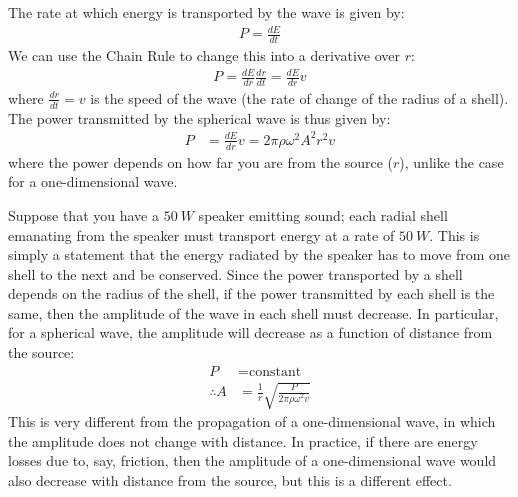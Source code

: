 The rate at which energy is transported by the wave is given by:
\begin{align*}
P = \frac{dE}{dt}
\end{align*}
We can use the Chain Rule to change this into a derivative over $r$:
\begin{align*}
P = \frac{dE}{dr}\frac{dr}{dt}=\frac{dE}{dr}v
\end{align*}
where $\frac{dr}{dt}=v$ is the speed of the wave (the rate of change of the radius of a shell). The power transmitted by the spherical wave is thus given by:
\begin{align*}
P &=\frac{dE}{dr}v =2\pi\rho  \omega^2 A^2  r^2 v
\end{align*}
where the power depends on how far you are from the source ($r$), unlike the case for a one-dimensional wave. 

Suppose that you have a $\SI{50}{W}$ speaker emitting sound; each radial shell emanating from the speaker must transport energy at a rate of $\SI{50}{W}$. This is simply a statement that the energy radiated by the speaker has to move from one shell to the next and be conserved. Since the power transported by a shell depends on the radius of the shell, if the power transmitted by each shell is the same, then the amplitude of the wave in each shell must decrease. In particular, for a spherical wave, the amplitude will decrease as a function of distance from the source:
\begin{align*}
P& = \text{constant}\\
\therefore A&=\frac{1}{r}\sqrt{\frac{P}{2\pi\rho \omega^2 v}}
\end{align*}
This is very different from the propagation of a one-dimensional wave, in which the amplitude does not change with distance. In practice, if there are energy losses due to, say, friction, then the amplitude of a one-dimensional wave would also decrease with distance from the source, but this is a different effect.

